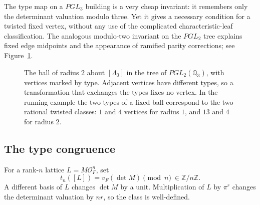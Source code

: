 \documentclass[12pt,letterpaper]{amsart}
\numberwithin{equation}{section}
\theoremstyle{definition}
\theoremstyle{plain}
\begin{document}
The type map on a $PGL_3$ building is a very cheap invariant: it
remembers only the determinant valuation modulo three. Yet it gives a
necessary condition for a twisted fixed vertex, without any use of
the complicated characteristic-leaf classification. The analogous
modulo-two invariant on the $PGL_2$ tree explains fixed edge
midpoints and the appearance of ramified parity corrections; see Figure~\ref{fig:new-tree-parity}.

\begin{figure}[htbp]
\centering
{}
\caption{The ball of radius $2$ about $[\Lambda_0]$ in the tree of
$PGL_2(\mathbb Q_3)$, with vertices marked by type. Adjacent vertices
have different types, so a transformation that exchanges the types
fixes no vertex. In the running example the two types of a fixed ball
correspond to the two rational twisted classes: $1$ and $4$ vertices
for radius $1$, and $13$ and $4$ for radius $2$.\label{fig:new-tree-parity}}
\end{figure}

\subsection{The type congruence}
For a rank-$n$ lattice $L=M\mathcal O_F^n$, set
\begin{equation}\label{eq:new-type}
 t_n([L])=v_F(\det M)\pmod n\ \in\mathbb Z/n\mathbb Z.
\end{equation}
A different basis of $L$ changes $\det M$ by a unit. Multiplication
of $L$ by $\pi^r$ changes the determinant valuation by $nr$, so the
class is well-defined.
\end{document}

